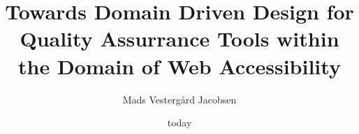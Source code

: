 

\title{Towards Domain Driven Design for Quality Assurrance Tools within the Domain of Web Accessibility}
\author{Mads Vesterg\aa rd Jacobsen}
\date{today}



	\maketitle

	
	
	
	
	
	
	

	


